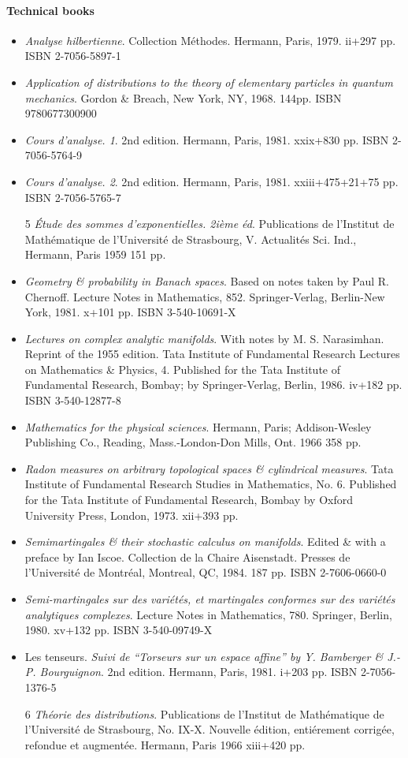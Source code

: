 \documentclass{article}
\begin{document}
\paragraph{Technical books}
\begin{itemize}
	\item \textit{Analyse hilbertienne}. Collection Méthodes. Hermann, Paris, 1979. ii+297 pp. ISBN 2-7056-5897-1
	\item \textit{Application of distributions to the theory of elementary particles in quantum mechanics}. Gordon \& Breach, New York, NY, 1968. 144pp. ISBN 9780677300900
	\item \textit{Cours d'analyse. 1}. 2nd edition. Hermann, Paris, 1981. xxix+830 pp. ISBN 2-7056-5764-9
	\item \textit{Cours d'analyse. 2}. 2nd edition. Hermann, Paris, 1981. xxiii+475+21+75 pp. ISBN 2-7056-5765-7
	\item [5] \textit{Étude des sommes d'exponentielles. 2ième éd}. Publications de l'Institut de Mathématique de l'Université de Strasbourg, V. Actualités Sci. Ind., Hermann, Paris 1959 151 pp.
	\item \textit{Geometry \& probability in Banach spaces}. Based on notes taken by Paul R. Chernoff. Lecture Notes in Mathematics, 852. Springer-Verlag, Berlin-New York, 1981. x+101 pp. ISBN 3-540-10691-X
	\item \textit{Lectures on complex analytic manifolds}. With notes by M. S. Narasimhan. Reprint of the 1955 edition. Tata Institute of Fundamental Research Lectures on Mathematics \& Physics, 4. Published for the Tata Institute of Fundamental Research, Bombay; by Springer-Verlag, Berlin, 1986. iv+182 pp. ISBN 3-540-12877-8
	\item \textit{Mathematics for the physical sciences}. Hermann, Paris; Addison-Wesley Publishing Co., Reading, Mass.-London-Don Mills, Ont. 1966 358 pp.
	\item \textit{Radon measures on arbitrary topological spaces \& cylindrical measures}. Tata Institute of Fundamental Research Studies in Mathematics, No. 6. Published for the Tata Institute of Fundamental Research, Bombay by Oxford University Press, London, 1973. xii+393 pp.
	\item \textit{Semimartingales \& their stochastic calculus on manifolds}. Edited \& with a preface by Ian Iscoe. Collection de la Chaire Aisenstadt. Presses de l'Université de Montréal, Montreal, QC, 1984. 187 pp. ISBN 2-7606-0660-0
	\item \textit{Semi-martingales sur des variétés, et martingales conformes sur des variétés analytiques complexes}. Lecture Notes in Mathematics, 780. Springer, Berlin, 1980. xv+132 pp. ISBN 3-540-09749-X
	\item Les tenseurs. \textit{Suivi de ``Torseurs sur un espace affine'' by Y. Bamberger \& J.-P. Bourguignon}. 2nd edition. Hermann, Paris, 1981. i+203 pp. ISBN 2-7056-1376-5
	\item [6] \textit{Théorie des distributions}. Publications de l'Institut de Mathématique de l'Université de Strasbourg, No. IX-X. Nouvelle édition, entiérement corrigée, refondue et augmentée. Hermann, Paris 1966 xiii+420 pp.
\end{itemize}
\end{document}
